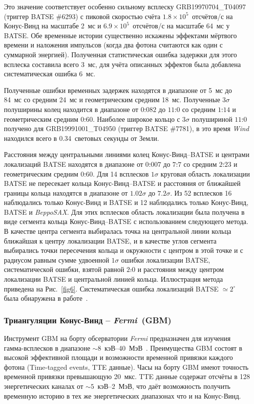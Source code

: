 Это значение соответствует особенно сильному всплеску GRB19970704\_T04097 
(триггер BATSE \#6293) с пиковой скоростью счёта $1.8\times10^5$~отсчётов/с 
на Конус-Винд на масштабе 2~мс и $6.9\times10^5$~отсчётов/с на масштабе 64~мс у BATSE. 
Обе временные истории существенно искажены эффектами мёртвого времени и наложения 
импульсов (когда два фотона считаются как один с суммарной энергией). 
Полученная статистическая ошибка задержки для этого всплеска составила всего 3~мс, 
для учёта описанных эффектов была добавлена систематическая ошибка 6~мс.

Полученные ошибки временных задержек находятся в диапазоне от 5~мс до 84~мс со 
средним 24~мс и геометрическим средним 18~мс. Полученные $3\sigma$ полуширины  
колец находится в диапазоне от $0\overset{\circ}{.}082$ до $11\overset{\circ}{.}0$ 
со средним $1\overset{\circ}{.}14$ и геометрическим средним $0\overset{\circ}{.}60$. 
Наиболее широкое кольцо с $3\sigma$ полушириной $11\overset{\circ}{.}0$ получено 
для GRB19991001\_T04950 (триггер BATSE \#7781), в это время \textit{Wind} находился 
всего в 0.34~световых секунды от Земли.

Расстояния между центральными линиями колец Конус-Винд--BATSE и центрами локализаций 
BATSE находятся в диапазоне от $0\overset{\circ}{.}007$ до $7\overset{\circ}{.}7$ 
со средним $2\overset{\circ}{.}23$ и геометрическим средним $0\overset{\circ}{.}60$. 
Для 14 всплесков $1\sigma$ круговая область локализации BATSE не пересекает кольца 
Конус-Винд--BATSE и расстояния от ближайшей границы кольца находятся в диапазоне 
от $1.02\sigma$ до $7.2\sigma$. Из 52 всплесков 16 наблюдались только Конус-Винд 
и BATSE и 12 наблюдались только Конус-Винд, BATSE и \textit{BeppoSAX}. Для этих 
всплесков область локализации была получена в виде сегмента кольца Конус-Винд--BATSE 
с использованием следующего метода. В качестве центра сегмента выбиралась точка 
на центральной линии кольца ближайшая к центру локализации BATSE, и в качестве 
углов сегмента выбирались точки пересечения кольца и окружности с центром в этой 
точке и с радиусом равным сумме удвоенной $1\sigma$ ошибки локализации BATSE, 
систематической ошибки, взятой равной $2\overset{\circ}{.}0$ и расстояния между 
центром локализации BATSE и центральной линией кольца. Иллюстрация метода приведена 
на Рис.~\ref{fig6}. Систематическая ошибка локализаций BATSE $\simeq2^{\circ}$ 
была обнаружена в работе~\citet{Briggs_1999ApJS}.

\subsubsection{Триангуляции Конус-Винд -- \textit{Fermi}~(GBM)}
Инструмент GBM на борту обсерватории \textit{Fermi} предназначен для изучения 
гамма-всплесков в диапазоне $\sim8$~кэВ--40~МэВ~\citep{Meegan_2009ApJ}. 
Преимущества GBM состоят в высокой эффективной площади и возможности временной 
привязки каждого фотона (Time-tagged events, TTE данные). Часы на борту GBM имеют 
точность временной привязки превышающую 20~мкс. TTE данные содержат отсчёты в 128 
энергетических каналах от $\sim5$~кэВ--2~МэВ, что даёт возможность получить 
временную историю в тех же энергетических диапазонах что и на Конус-Винд.

